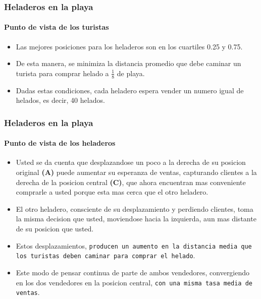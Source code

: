 \documentclass{beamer}
\begin{document}
\begin{frame}
  \frametitle{Heladeros en la playa}
  \framesubtitle{Punto de vista de los turistas}

  \begin{itemize}
    \setlength{\itemsep}{4pt}
    \item Las mejores posiciones para los heladeros son en los cuartiles 0.25 y 0.75.
    \pause
    \item De esta manera, se minimiza la distancia promedio que debe caminar un turista para comprar helado a $\frac{1}{8}$ de playa.
    \pause
    \item Dadas estas condiciones, cada heladero espera vender un numero igual de helados, es decir, 40 helados.
  \end{itemize}
\end{frame}

\begin{frame}
  \frametitle{Heladeros en la playa}
  \framesubtitle{Punto de vista de los heladeros}

  \begin{itemize}
    \setlength{\itemsep}{4pt}
    \item Usted se da cuenta que desplazandose un poco a la derecha de su posicion original \textbf{(A)} puede aumentar su esperanza de ventas, capturando clientes a la derecha de la posicion central \textbf{(C)}, que ahora encuentran mas conveniente comprarle a usted porque esta mas cerca que el otro heladero.
    \pause
    \item El otro heladero, consciente de su desplazamiento y perdiendo clientes, toma la misma decision que usted, moviendose hacia la izquierda, aun mas distante de su posicion que usted.
    \pause
    \item Estos desplazamientos, \texttt{producen un aumento en la distancia media que los turistas deben caminar para comprar el helado}.
    \pause
    \item Este modo de pensar continua de parte de ambos vendedores, convergiendo en los dos vendedores en la posicion central, \texttt{con una misma tasa media de ventas}.
  \end{itemize}
\end{frame}
\end{document}
